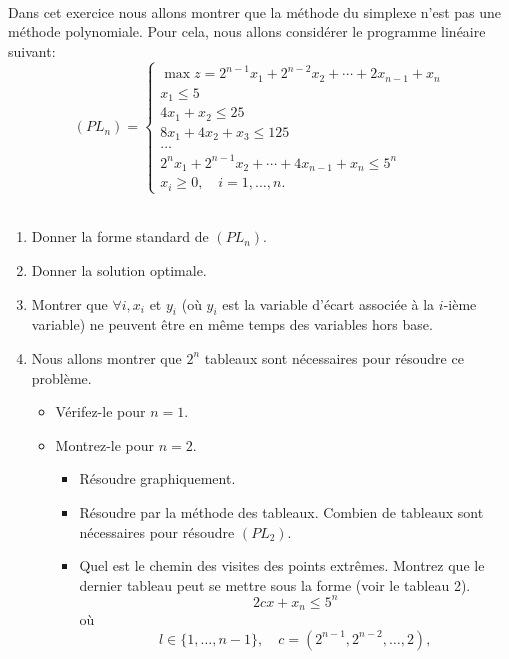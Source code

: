 \begin{td-exo}\,\\ %
	Dans cet exercice nous allons montrer que la méthode du simplexe n'est pas une méthode polynomiale.
	Pour cela, nous allons considérer le programme linéaire suivant:
	\begin{equation*}
		(PL_n)=
		\begin{cases}
			\max z = 2^{n-1} x_1 + 2^{n-2} x_2 + \cdots + 2x_{n-1} + x_n \\
			x_1 \leq 5\\
			4x_1 + x_2 \leq 25\\
			8x_1 + 4x_2 + x_3 \leq 125\\
			\ldots\\
			2^n x_1 + 2^{n-1} x_2 + \cdots + 4x_{n-1} + x_n \leq 5^n\\
			x_i \geq 0, \quad i=1,\ldots,n.
		\end{cases}
	\end{equation*}\,
	\begin{enumerate}
		\item Donner la forme standard de \((PL_n)\).
		\item Donner la solution optimale.
		\item Montrer que \(\forall i, x_i\) et \(y_i\) (où \(y_i\) est la variable d'écart associée à la \(i\)-ième
		variable) ne peuvent être en même temps des variables hors base.
		\item Nous allons montrer que \(2^n\) tableaux sont nécessaires pour résoudre ce problème.
		\begin{itemize}
			\item Vérifez-le pour \(n=1\).
			\item Montrez-le pour \(n=2\).
			\begin{itemize}
				\item Résoudre graphiquement.
				\item Résoudre par la méthode des tableaux. Combien de tableaux sont nécessaires
				pour résoudre \((PL_2)\).
				\item Quel est le chemin des visites des points extrêmes. Montrez que le 
				dernier tableau peut se mettre sous la forme (voir le tableau 2).
				\begin{equation*}
					2cx + x_n \leq 5^n
				\end{equation*}
				où
				\begin{equation*}
					l\in \{1,\ldots,n-1\}, \quad c = (2^{n-1}, 2^{n-2}, \ldots, 2),

\end{equation*}
\end{itemize}
\end{itemize}
\end{enumerate}
\end{td-exo}
